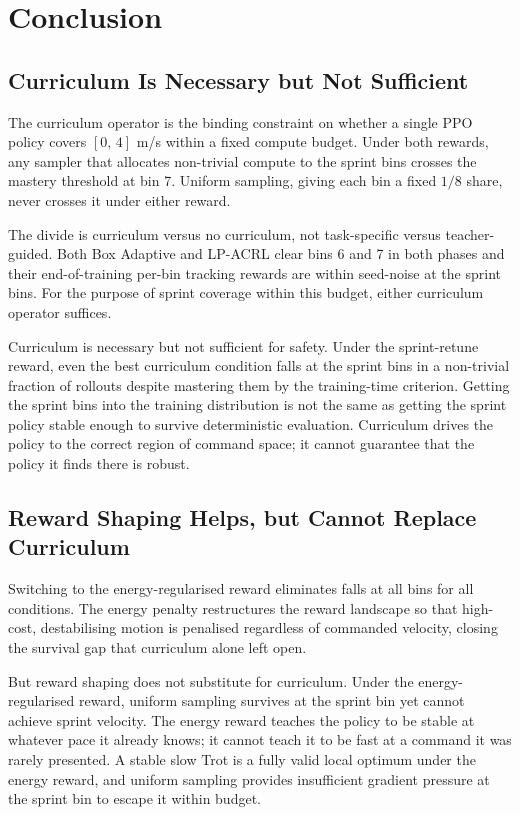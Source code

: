 \documentclass[a4paper,11pt]{article}
\begin{document}
    \section{Conclusion}

    \subsection{Curriculum Is Necessary but Not Sufficient}

    The curriculum operator is the binding constraint on whether a single PPO policy covers $[0,\,4]$ m/s within a fixed compute budget. Under both rewards, any sampler that allocates non-trivial compute to the sprint bins crosses the mastery threshold at bin 7. Uniform sampling, giving each bin a fixed $1/8$ share, never crosses it under either reward.

    The divide is curriculum versus no curriculum, not task-specific versus teacher-guided. Both Box Adaptive and LP-ACRL clear bins 6 and 7 in both phases and their end-of-training per-bin tracking rewards are within seed-noise at the sprint bins. For the purpose of sprint coverage within this budget, either curriculum operator suffices.

    Curriculum is necessary but not sufficient for safety. Under the sprint-retune reward, even the best curriculum condition falls at the sprint bins in a non-trivial fraction of rollouts despite mastering them by the training-time criterion. Getting the sprint bins into the training distribution is not the same as getting the sprint policy stable enough to survive deterministic evaluation. Curriculum drives the policy to the correct region of command space; it cannot guarantee that the policy it finds there is robust.

    \subsection{Reward Shaping Helps, but Cannot Replace Curriculum}

    Switching to the energy-regularised reward eliminates falls at all bins for all conditions. The energy penalty restructures the reward landscape so that high-cost, destabilising motion is penalised regardless of commanded velocity, closing the survival gap that curriculum alone left open.

    But reward shaping does not substitute for curriculum. Under the energy-regularised reward, uniform sampling survives at the sprint bin yet cannot achieve sprint velocity. The energy reward teaches the policy to be stable at whatever pace it already knows; it cannot teach it to be fast at a command it was rarely presented. A stable slow Trot is a fully valid local optimum under the energy reward, and uniform sampling provides insufficient gradient pressure at the sprint bin to escape it within budget.
\end{document}
